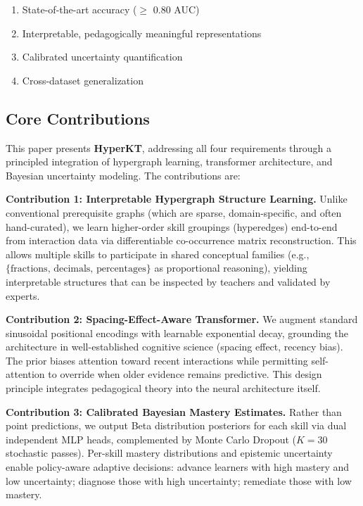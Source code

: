 \documentclass[preprint,12pt]{elsarticle}
\begin{document}
\begin{enumerate}
\item State-of-the-art accuracy ($\geq$ 0.80 AUC)
\item Interpretable, pedagogically meaningful representations
\item Calibrated uncertainty quantification
\item Cross-dataset generalization
\end{enumerate}

\subsection{Core Contributions}

This paper presents \textbf{HyperKT}, addressing all four requirements through a principled integration of hypergraph learning, transformer architecture, and Bayesian uncertainty modeling. The contributions are:

\textbf{Contribution 1: Interpretable Hypergraph Structure Learning.} Unlike conventional prerequisite graphs (which are sparse, domain-specific, and often hand-curated), we learn higher-order skill groupings (hyperedges) end-to-end from interaction data via differentiable co-occurrence matrix reconstruction. This allows multiple skills to participate in shared conceptual families (e.g., $\{\text{fractions, decimals, percentages}\}$ as proportional reasoning), yielding interpretable structures that can be inspected by teachers and validated by experts.

\textbf{Contribution 2: Spacing-Effect-Aware Transformer.} We augment standard sinusoidal positional encodings with learnable exponential decay, grounding the architecture in well-established cognitive science (spacing effect, recency bias). The prior biases attention toward recent interactions while permitting self-attention to override when older evidence remains predictive. This design principle integrates pedagogical theory into the neural architecture itself.

\textbf{Contribution 3: Calibrated Bayesian Mastery Estimates.} Rather than point predictions, we output Beta distribution posteriors for each skill via dual independent MLP heads, complemented by Monte Carlo Dropout ($K=30$ stochastic passes). Per-skill mastery distributions and epistemic uncertainty enable policy-aware adaptive decisions: advance learners with high mastery and low uncertainty; diagnose those with high uncertainty; remediate those with low mastery.
\end{document}
